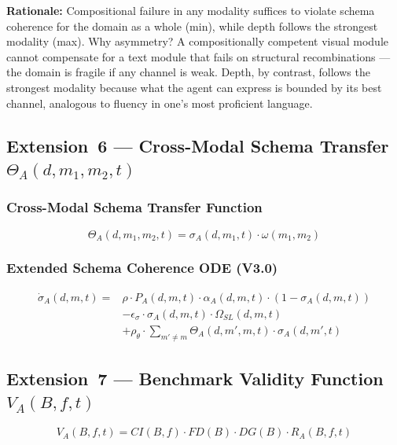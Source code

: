 \documentclass[11pt]{article}
\theoremstyle{definition}
\theoremstyle{plain}
\begin{document}
\textbf{Rationale:} Compositional failure in any modality suffices to
violate schema coherence for the domain as a whole (min), while
depth follows the strongest modality (max). Why asymmetry? A
compositionally competent visual module cannot compensate for a text
module that fails on structural recombinations --- the domain is
fragile if any channel is weak. Depth, by contrast, follows the
strongest modality because what the agent can express is bounded by
its best channel, analogous to fluency in one's most proficient language.

\subsection{Extension~6 --- Cross-Modal Schema Transfer \texorpdfstring{$\Theta_A(d,m_1,m_2,t)$}{Theta\_A(d,m\_1,m\_2,t)}}\label{sec:cross-modal}

\subsubsection{Cross-Modal Schema Transfer Function}
\begin{equation}\label{eq:cross-modal-transfer}
\Theta_A(d, m_1, m_2, t) = \sigma_A(d, m_1, t) \cdot \omega(m_1, m_2)
\end{equation}

\subsubsection{Extended Schema Coherence ODE (V3.0)}
\begin{equation}\label{eq:sigma-ode-v3}
\begin{aligned}
\dot{\sigma}_A(d,m,t) = {} & \rho \cdot P_A(d,m,t) \cdot \alpha_A(d,m,t) \cdot (1 - \sigma_A(d,m,t)) \\
& - \epsilon_{\sigma} \cdot \sigma_A(d,m,t) \cdot \Omega_{SL}(d,m,t) \\
& + \rho_{\theta} \cdot \sum_{m' \neq m} \Theta_A(d,m',m,t) \cdot \sigma_A(d,m',t)
\end{aligned}
\end{equation}

\subsection{Extension~7 --- Benchmark Validity Function \texorpdfstring{$V_A(B,f,t)$}{V\_A(B,f,t)}}\label{sec:validity}

\begin{equation}\label{eq:validity-function}
V_A(B,f,t) = CI(B,f) \cdot FD(B) \cdot DG(B) \cdot R_A(B,f,t) %
\end{equation}
\end{document}
